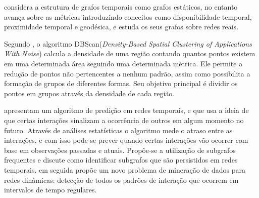 \cite{kostakos} considera a estrutura de grafos temporais como grafos
estáticos, no entanto avança sobre as métricas introduzindo conceitos como disponibilidade
temporal, proximidade temporal e geodésica, e estuda os seus grafos sobre redes reais.

Segundo \cite{density-based-clusters}, o algoritmo DBScan(\textit{Density-Based Spatial Clustering
of Applications With Noise}) calcula a densidade de uma região contando quantos pontos existem
em uma determinada área seguindo uma determinada métrica. Ele permite a redução de pontos não
pertencentes a nenhum padrão, assim como possibilita a formação de grupos de diferentes formas.
Seu objetivo principal é dividir os pontos em grupos através da densidade de cada região.

\cite{lahiri2007} apresentam um algoritmo de predição em redes temporais, e que usa a ideia de que certas
interações sinalizam a ocorrência de outros em algum momento no futuro. Através de análises estatísticas
o algoritmo mede o atraso entre as interações, e com isso pode-se prever quando certas interações vão ocorrer
com base em observações passadas e atuais. Propõe-se a utilização de subgrafos frequentes e discute
como identificar subgrafos que são persistidos em redes temporais.
\cite{lahiri2008} em seguida propõe um novo problema de mineração de dados para redes dinâmicas:
detecção de todos os padrões de interação que ocorrem em intervalos de tempo regulares.












